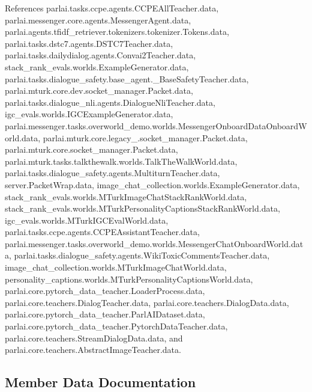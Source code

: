References parlai.\+tasks.\+ccpe.\+agents.\+C\+C\+P\+E\+All\+Teacher.\+data, parlai.\+messenger.\+core.\+agents.\+Messenger\+Agent.\+data, parlai.\+agents.\+tfidf\+\_\+retriever.\+tokenizers.\+tokenizer.\+Tokens.\+data, parlai.\+tasks.\+dstc7.\+agents.\+D\+S\+T\+C7\+Teacher.\+data, parlai.\+tasks.\+dailydialog.\+agents.\+Convai2\+Teacher.\+data, stack\+\_\+rank\+\_\+evals.\+worlds.\+Example\+Generator.\+data, parlai.\+tasks.\+dialogue\+\_\+safety.\+base\+\_\+agent.\+\_\+\+Base\+Safety\+Teacher.\+data, parlai.\+mturk.\+core.\+dev.\+socket\+\_\+manager.\+Packet.\+data, parlai.\+tasks.\+dialogue\+\_\+nli.\+agents.\+Dialogue\+Nli\+Teacher.\+data, igc\+\_\+evals.\+worlds.\+I\+G\+C\+Example\+Generator.\+data, parlai.\+messenger.\+tasks.\+overworld\+\_\+demo.\+worlds.\+Messenger\+Onboard\+Data\+Onboard\+World.\+data, parlai.\+mturk.\+core.\+legacy\+\_.\+socket\+\_\+manager.\+Packet.\+data, parlai.\+mturk.\+core.\+socket\+\_\+manager.\+Packet.\+data, parlai.\+mturk.\+tasks.\+talkthewalk.\+worlds.\+Talk\+The\+Walk\+World.\+data, parlai.\+tasks.\+dialogue\+\_\+safety.\+agents.\+Multiturn\+Teacher.\+data, server.\+Packet\+Wrap.\+data, image\+\_\+chat\+\_\+collection.\+worlds.\+Example\+Generator.\+data, stack\+\_\+rank\+\_\+evals.\+worlds.\+M\+Turk\+Image\+Chat\+Stack\+Rank\+World.\+data, stack\+\_\+rank\+\_\+evals.\+worlds.\+M\+Turk\+Personality\+Captions\+Stack\+Rank\+World.\+data, igc\+\_\+evals.\+worlds.\+M\+Turk\+I\+G\+C\+Eval\+World.\+data, parlai.\+tasks.\+ccpe.\+agents.\+C\+C\+P\+E\+Assistant\+Teacher.\+data, parlai.\+messenger.\+tasks.\+overworld\+\_\+demo.\+worlds.\+Messenger\+Chat\+Onboard\+World.\+data, parlai.\+tasks.\+dialogue\+\_\+safety.\+agents.\+Wiki\+Toxic\+Comments\+Teacher.\+data, image\+\_\+chat\+\_\+collection.\+worlds.\+M\+Turk\+Image\+Chat\+World.\+data, personality\+\_\+captions.\+worlds.\+M\+Turk\+Personality\+Captions\+World.\+data, parlai.\+core.\+pytorch\+\_\+data\+\_\+teacher.\+Loader\+Process.\+data, parlai.\+core.\+teachers.\+Dialog\+Teacher.\+data, parlai.\+core.\+teachers.\+Dialog\+Data.\+data, parlai.\+core.\+pytorch\+\_\+data\+\_\+teacher.\+Parl\+A\+I\+Dataset.\+data, parlai.\+core.\+pytorch\+\_\+data\+\_\+teacher.\+Pytorch\+Data\+Teacher.\+data, parlai.\+core.\+teachers.\+Stream\+Dialog\+Data.\+data, and parlai.\+core.\+teachers.\+Abstract\+Image\+Teacher.\+data.



\subsection{Member Data Documentation}
\mbox{\label{classparlai_1_1tasks_1_1dstc7_1_1agents_1_1DSTC7Teacher_a1410f6e230ea0a01e373e2dde387440a}} 
